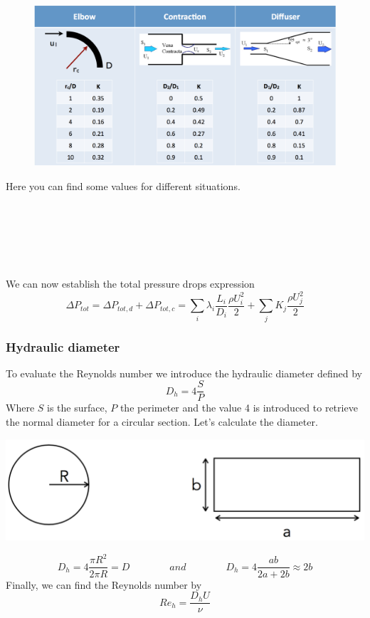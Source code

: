 	\begin{figure}
	\vspace{-5mm}
	\includegraphics[scale=0.25]{ch2/8}
	\end{figure}
	Here you can find some values for different situations. \\\\\\\\\\\\\\
	We can now establish the total pressure drops expression 
	\begin{equation}
		\Delta P_{tot} = \Delta P_{tot,d} + \Delta P_{tot,c} = \sum _i \lambda _i \frac{L_i}{D_i}\frac{\rho U_i^2}{2} + \sum _j K_j \frac{\rho U_j^2}{2}
	\end{equation}	 
	
	\subsubsection{Hydraulic diameter}
		To evaluate the Reynolds number we introduce the hydraulic diameter defined by 
		\begin{equation}
			D_h = 4\frac{S}{P}
		\end{equation}
		Where $S$ is the surface, $P$ the perimeter and the value 4 is introduced to retrieve the normal diameter for a circular section. Let's calculate the diameter.
		\begin{center}
		\includegraphics[scale=0.4]{ch2/9}
		\end{center}
		\begin{equation}
			D_h = 4\frac{\pi R^2}{2\pi R} = D \qquad\qquad and \qquad\qquad D_h = 4 \frac{ab}{2a+2b} \approx 2b
		\end{equation}
		Finally, we can find the Reynolds number by
		\begin{equation}
			Re_h = \frac{D_hU}{\nu}
		\end{equation}